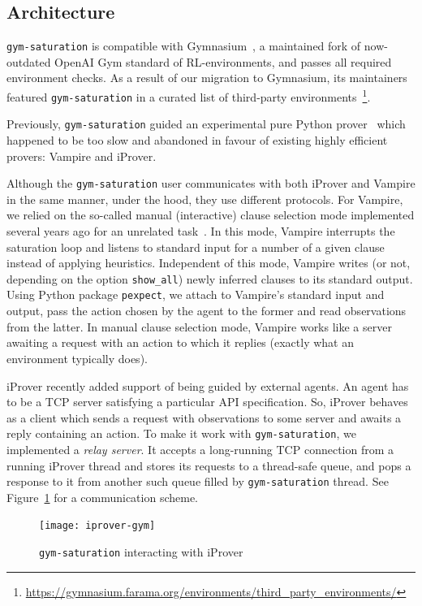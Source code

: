 \documentclass[runningheads]{llncs}
\begin{document}
\subsection{Architecture}
\texttt{gym-saturation} is compatible with Gymnasium~\cite{towers_gymnasium_2023}, a maintained fork of now-outdated OpenAI Gym standard of RL-environments, and passes all required environment checks. As a result of our migration to Gymnasium, its maintainers featured \texttt{gym-saturation} in a curated list of third-party environments~\footnote{\url{https://gymnasium.farama.org/environments/third_party_environments/}}.

Previously, \texttt{gym-saturation} guided an experimental pure Python prover~\cite{Shminke2022} which happened to be too slow and abandoned in favour of existing highly efficient provers: Vampire and iProver.

Although the \texttt{gym-saturation} user communicates with both iProver and Vampire in the same manner, under the hood, they use different protocols. For Vampire, we relied on the so-called manual (interactive) clause selection mode implemented several years ago for an unrelated task~\cite{10.1007/978-3-030-34968-4_28}. In this mode, Vampire interrupts the saturation loop and listens to standard input for a number of a given clause instead of applying heuristics. Independent of this mode, Vampire writes (or not, depending on the option \texttt{show\_all}) newly inferred clauses to its standard output. Using Python package \texttt{pexpect}, we attach to Vampire's standard input and output, pass the action chosen by the agent to the former and read observations from the latter. In manual clause selection mode, Vampire works like a server awaiting a request with an action to which it replies (exactly what an environment typically does).

iProver recently added support of being guided by external agents. An agent has to be a TCP server satisfying a particular API specification. So, iProver behaves as a client which sends a request with observations to some server and awaits a reply containing an action. To make it work with \texttt{gym-saturation}, we implemented a \emph{relay server}. It accepts a long-running TCP connection from a running iProver thread and stores its requests to a thread-safe queue, and pops a response to it from another such queue filled by \texttt{gym-saturation} thread. See Figure~\ref{fig:iprover-gym} for a communication scheme.
\begin{figure}
\texttt{[image: iprover-gym]}
\caption{\texttt{gym-saturation} interacting with iProver}\label{fig:iprover-gym}
\end{figure}
\end{document}
